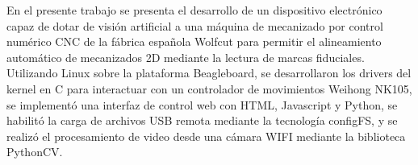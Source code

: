 En el presente trabajo se presenta el desarrollo de un dispositivo electrónico capaz de dotar de visión artificial a una máquina de mecanizado por control numérico CNC de la fábrica española Wolfcut para permitir el alineamiento automático de mecanizados 2D mediante la lectura de marcas fiduciales.
Utilizando Linux sobre la plataforma Beagleboard, se desarrollaron los drivers del kernel en C para interactuar con un controlador de movimientos Weihong NK105, se implementó una interfaz de control web con HTML, Javascript y Python, se habilitó la carga de archivos USB remota mediante la tecnología configFS, y se realizó el procesamiento de video desde una cámara WIFI mediante la biblioteca PythonCV.
